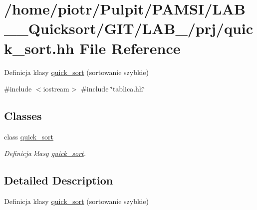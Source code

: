 \hypertarget{quick__sort_8hh}{\section{/home/piotr/\-Pulpit/\-P\-A\-M\-S\-I/\-L\-A\-B\-\_\-\_\-\-Quicksort/\-G\-I\-T/\-L\-A\-B\-\_/prj/quick\-\_\-sort.hh \-File \-Reference}
\label{quick__sort_8hh}
}


\-Definicja klasy \hyperlink{classquick__sort}{quick\-\_\-sort} (sortowanie szybkie)  


{\ttfamily \#include $<$iostream$>$}\*
{\ttfamily \#include \char`\"{}tablica.\-hh\char`\"{}}\*
\subsection*{\-Classes}
\begin{DoxyCompactItemize}
\item 
class \hyperlink{classquick__sort}{quick\-\_\-sort}
\begin{DoxyCompactList}\small\item\em \-Definicja klasy \hyperlink{classquick__sort}{quick\-\_\-sort}. \end{DoxyCompactList}\end{DoxyCompactItemize}


\subsection{\-Detailed \-Description}
\-Definicja klasy \hyperlink{classquick__sort}{quick\-\_\-sort} (sortowanie szybkie) 